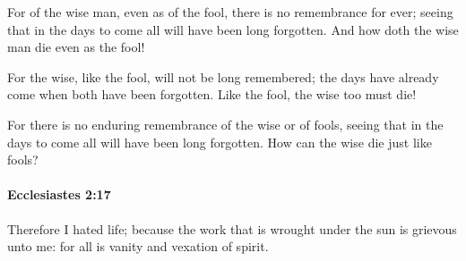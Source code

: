 			\begin{versebox}
					\item[BHS] 
					\item[LXX] 
					\item[ASV] For of the wise man, even as of the fool, there is no remembrance for ever; seeing that in the days to come all will have been long forgotten. And how doth the wise man die even as the fool!
					\item[NIV] For the wise, like the fool, will not be long remembered; the days have already come when both have been forgotten. Like the fool, the wise too must die!
					\item[NRSV] For there is no enduring remembrance of the wise or of fools, seeing that in the days to come all will have been long forgotten. How can the wise die just like fools?
			\end{versebox}

		\paragraph{Ecclesiastes 2:17} %
			\label{ECCLESIASTES-2-17}

			Therefore I hated life; because the work that is wrought under the sun is grievous unto me: for all is vanity and vexation of spirit.

